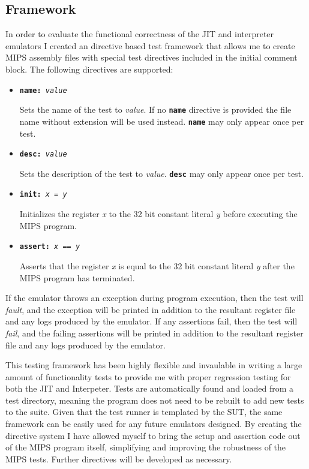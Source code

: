 \subsection{Framework}

In order to evaluate the functional correctness of the JIT and interpreter emulators I created an directive based test framework that allows me to create MIPS assembly files with special test directives included in the initial comment block. The following directives are supported:

\begin{itemize}
    \item \texttt{\textbf{name:} \textit{value}}
    
    Sets the name of the test to \textit{value}. If no \texttt{\textbf{name}} directive is provided the file name without extension will be used instead. \texttt{\textbf{name}} may only appear once per test.

    \item \texttt{\textbf{desc:} \textit{value}}
    
    Sets the description of the test to \textit{value}. \texttt{\textbf{desc}} may only appear once per test.

    \item \texttt{\textbf{init:} \textit{x} = \textit{y}}
    
    Initializes the register \textit{x} to the 32 bit constant literal \textit{y} before executing the MIPS program.

    \item \texttt{\textbf{assert:} \textit{x} == \textit{y}}
    
    Asserts that the register \textit{x} is equal to the 32 bit constant literal \textit{y} after the MIPS program has terminated.
\end{itemize}

If the emulator throws an exception during program execution, then the test will \emph{fault}, and the exception will be printed in addition to the resultant register file and any logs produced by the emulator. If any assertions fail, then the test will \emph{fail}, and the failing assertions will be printed in addition to the resultant register file and any logs produced by the emulator.

This testing framework has been highly flexible and invaulable in writing a large amount of functionality tests to provide me with proper regression testing for both the JIT and Interpeter. Tests are automatically found and loaded from a test directory, meaning the program does not need to be rebuilt to add new tests to the suite. Given that the test runner is templated by the SUT, the same framework can be easily used for any future emulators designed. By creating the directive system I have allowed myself to bring the setup and assertion code out of the MIPS program itself, simplifying and improving the robustness of the MIPS tests. Further directives will be developed as necessary.

